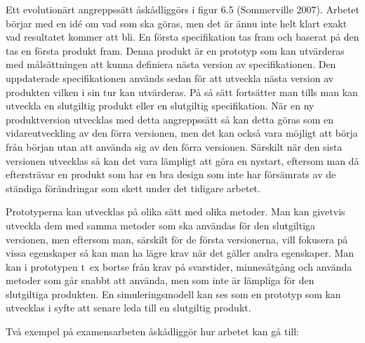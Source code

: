 Ett evolutionärt angreppssätt åskådliggörs i figur 6.5 (Sommerville
2007). Arbetet börjar med en idé om vad som ska göras, men det är ännu
inte helt klart exakt vad resultatet kommer att bli. En första
specifikation tas fram och baserat på den tas en första produkt fram.
Denna produkt är en prototyp som kan utvärderas med målsättningen att
kunna definiera nästa version av specifikationen. Den uppdaterade
specifikationen används sedan för att utveckla nästa version av
produkten vilken i sin tur kan utvärderas. På så sätt fortsätter man
tills man kan utveckla en slutgiltig produkt eller en slutgiltig
specifikation. När en ny produktversion utvecklas med detta angreppssätt
så kan detta göras som en vidareutveckling av den förra versionen, men
det kan också vara möjligt att börja från början utan att använda sig av
den förra versionen. Särskilt när den sista versionen utvecklas så kan
det vara lämpligt att göra en nystart, eftersom man då eftersträvar en
produkt som har en bra design som inte har försämrats av de ständiga
förändringar som skett under det tidigare arbetet.

Prototyperna kan utvecklas på olika sätt med olika metoder. Man kan
givetvis utveckla dem med samma metoder som ska användas för den
slutgiltiga versionen, men eftersom man, särskilt för de första
versionerna, vill fokusera på vissa egenskaper så kan man ha lägre krav
när det gäller andra egenskaper. Man kan i prototypen t~ex bortse från
krav på svarstider, minnesåtgång och använda metoder som går snabbt att
använda, men som inte är lämpliga för den slutgiltiga produkten. En
simuleringsmodell kan ses som en prototyp som kan utvecklas i syfte att
senare leda till en slutgiltig produkt.

Två exempel på examensarbeten åskådliggör hur arbetet kan gå till:


